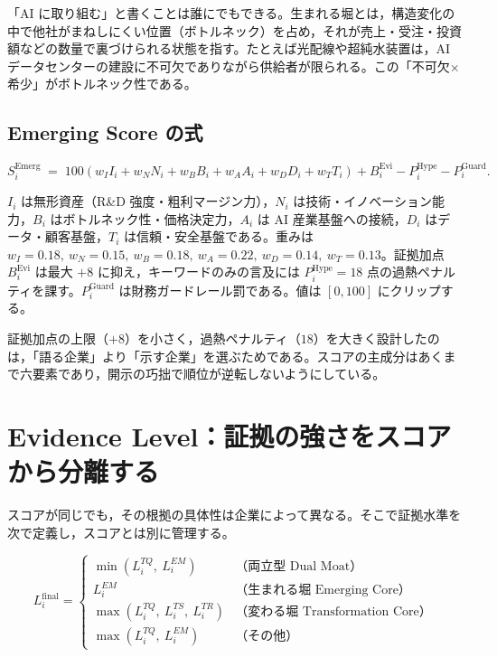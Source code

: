 \documentclass[a4paper,10pt]{article}
\begin{document}
「AI に取り組む」と書くことは誰にでもできる。生まれる堀とは，構造変化の中で他社がまねしにくい位置（ボトルネック）を占め，それが売上・受注・投資額などの数量で裏づけられる状態を指す。たとえば光配線や超純水装置は，AI データセンターの建設に不可欠でありながら供給者が限られる。この「不可欠×希少」がボトルネック性である。

\subsection{Emerging Score の式}

\begin{equation}
S^{\mathrm{Emerg}}_i \;=\; 100\left(w_I I_i + w_N N_i + w_B B_i + w_A A_i + w_D D_i + w_T T_i\right) + B^{\mathrm{Evi}}_i - P^{\mathrm{Hype}}_i - P^{\mathrm{Guard}}_i.
\label{eq:emerging}
\end{equation}

$I_i$ は無形資産（R\&D 強度・粗利マージン力），$N_i$ は技術・イノベーション能力，$B_i$ はボトルネック性・価格決定力，$A_i$ は AI 産業基盤への接続，$D_i$ はデータ・顧客基盤，$T_i$ は信頼・安全基盤である。重みは $w_I{=}0.18,\ w_N{=}0.15,\ w_B{=}0.18,\ w_A{=}0.22,\ w_D{=}0.14,\ w_T{=}0.13$。証拠加点 $B^{\mathrm{Evi}}_i$ は最大 $+8$ に抑え，キーワードのみの言及には $P^{\mathrm{Hype}}_i=18$ 点の過熱ペナルティを課す。$P^{\mathrm{Guard}}_i$ は財務ガードレール罰である。値は $[0,100]$ にクリップする。

\begin{defbox}
証拠加点の上限（$+8$）を小さく，過熱ペナルティ（$18$）を大きく設計したのは，「語る企業」より「示す企業」を選ぶためである。スコアの主成分はあくまで六要素であり，開示の巧拙で順位が逆転しないようにしている。
\end{defbox}

\section{Evidence Level：証拠の強さをスコアから分離する}
\label{sec:evidence}

スコアが同じでも，その根拠の具体性は企業によって異なる。そこで証拠水準を次で定義し，スコアとは別に管理する。

\begin{equation}
L^{\mathrm{final}}_i =
\begin{cases}
\min\!\left(L^{TQ}_i,\ L^{EM}_i\right) & \text{（両立型 Dual Moat）}\\[2pt]
L^{EM}_i & \text{（生まれる堀 Emerging Core）}\\[2pt]
\max\!\left(L^{TQ}_i,\ L^{TS}_i,\ L^{TR}_i\right) & \text{（変わる堀 Transformation Core）}\\[2pt]
\max\!\left(L^{TQ}_i,\ L^{EM}_i\right) & \text{（その他）}
\end{cases}
\label{eq:evidence}
\end{equation}
\end{document}
